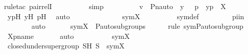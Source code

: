 \begin{isabellebody}
{\isacharparenleft}{\kern0pt}rule{\isacharunderscore}{\kern0pt}tac\ pair{\isacharunderscore}{\kern0pt}relI{\isacharparenright}{\kern0pt}\isanewline
\ \ \ \ \ \ \ \ \isamarkupfalse%
\ simp\isanewline
\ \ \ \ \ \ \isamarkupfalse%
\ \isamarkupfalse%
\ {\isachardoublequoteopen}v\ {\isasymin}\ {\isacharbraceleft}{\kern0pt}{\isasymlangle}Pn{\isacharunderscore}{\kern0pt}auto{\isacharparenleft}{\kern0pt}{\isasympi}{\isacharparenright}{\kern0pt}\ {\isacharbackquote}{\kern0pt}\ y{\isacharcomma}{\kern0pt}\ {\isasympi}\ {\isacharbackquote}{\kern0pt}\ p{\isasymrangle}\ {\isachardot}{\kern0pt}\ {\isasymlangle}y{\isacharcomma}{\kern0pt}p{\isasymrangle}\ {\isasymin}\ X{\isacharbraceright}{\kern0pt}{\isachardoublequoteclose}\ \isamarkupfalse%
\ ypH\ y{\isacharprime}{\kern0pt}H\ p{\isacharprime}{\kern0pt}H\ \isamarkupfalse%
\ auto\isanewline
\ \ \ \ \isamarkupfalse%
\isanewline
\ \ \ \ \isamarkupfalse%
\ \isamarkupfalse%
\ {\isachardoublequoteopen}{\isasympi}\ {\isasymin}\ sym{\isacharparenleft}{\kern0pt}X{\isacharparenright}{\kern0pt}{\isachardoublequoteclose}\ \ \isanewline
\ \ \ \ \ \ \isamarkupfalse%
\ sym{\isacharunderscore}{\kern0pt}def\ \isanewline
\ \ \ \ \ \ \isamarkupfalse%
\ piin{\isasymG}\isanewline
\ \ \ \ \ \ \isamarkupfalse%
\ auto\isanewline
\ \ \isamarkupfalse%
\isanewline
\isanewline
\ \ \isamarkupfalse%
\ {\isachardoublequoteopen}sym{\isacharparenleft}{\kern0pt}X{\isacharparenright}{\kern0pt}\ {\isasymin}\ P{\isacharunderscore}{\kern0pt}auto{\isacharunderscore}{\kern0pt}subgroups{\isacharparenleft}{\kern0pt}{\isasymG}{\isacharparenright}{\kern0pt}{\isachardoublequoteclose}\ \isanewline
\ \ \ \ \isamarkupfalse%
{\isacharparenleft}{\kern0pt}rule\ sym{\isacharunderscore}{\kern0pt}P{\isacharunderscore}{\kern0pt}auto{\isacharunderscore}{\kern0pt}subgroup{\isacharparenright}{\kern0pt}\isanewline
\ \ \ \ \isamarkupfalse%
\ Xpname\ \isanewline
\ \ \ \ \isamarkupfalse%
\ auto\isanewline
\ \ \ \ \isanewline
\ \ \isamarkupfalse%
\ \isamarkupfalse%
\ {\isachardoublequoteopen}sym{\isacharparenleft}{\kern0pt}X{\isacharparenright}{\kern0pt}\ {\isasymin}\ {\isasymF}{\isachardoublequoteclose}\ \isanewline
\ \ \ \ \isamarkupfalse%
\ {\isasymF}{\isacharunderscore}{\kern0pt}closed{\isacharunderscore}{\kern0pt}under{\isacharunderscore}{\kern0pt}supergroup\ SH\ {\isacartoucheopen}S\ {\isasymsubseteq}\ sym{\isacharparenleft}{\kern0pt}X{\isacharparenright}{\kern0pt}{\isacartoucheclose}\isanewline

\end{isabellebody}
